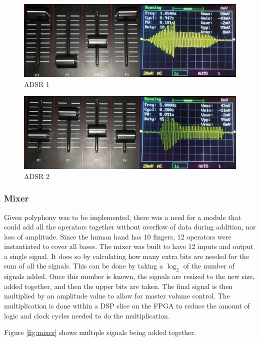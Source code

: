 \documentclass[12pt]{article}
\begin{document}
\begin{figure}[htb]
    \centering
    \includegraphics[width=\textwidth]{img/adsr1.png}
    \caption{ADSR 1}
    \label{fig:adsr1}
\end{figure}

\begin{figure}[htb]
    \centering
    \includegraphics[width=\textwidth]{img/adsr2.png}
    \caption{ADSR 2}
    \label{fig:adsr2}
\end{figure}

\subsubsection{Mixer}

Given polyphony was to be implemented, there was a need for a module that could add all the operators together without overflow of data during addition, nor loss of amplitude. Since the human hand has 10 fingers, 12 operators were instantiated to cover all bases. The mixer was built to have 12 inputs and output a single signal. It does so by calculating how many extra bits are needed for the sum of all the signals. This can be done by taking a $\log_2$ of the number of signals added. Once this number is known, the signals are resized to the new size, added together, and then the upper bits are taken. The final signal is then multiplied by an amplitude value to allow for master volume control. The multiplication is done within a DSP slice on the FPGA to reduce the amount of logic and clock cycles needed to do the multiplication.

Figure \ref{fig:mixer} shows multiple signals being added together.
\end{document}
